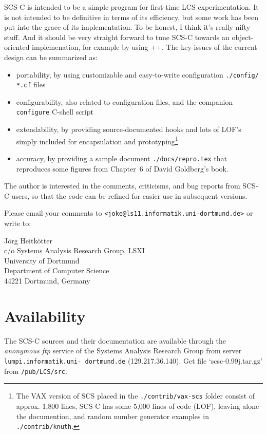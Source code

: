 SCS-C is intended to be a simple program for first-time LCS experimentation.
It is not intended to be definitive in terms of its efficiency, but
some work has been put into the grace of its implementation. To be honest,
I think it's really nifty stuff.
And it should be very straight forward to tune SCS-C towards an
object-oriented implemenation, for example by using \C++.
The key issues of the current design can be summarized as:
\begin{itemize}
\item
portability, by using customizable and easy-to-write configuration
{\tt ./config/ *.cf} files
\item
configurability, also related to configuration files, and the
companion {\tt configure} C-shell script
\item
extendability, by providing source-documented hooks and lots of
LOF's simply included for encapsulation and prototyping\footnote{%
The {\sc VAX} version of SCS placed in the {\tt ./contrib/vax-scs} folder
consist of approx. 1,800 lines, SCS-C has some 5,000 lines of code (LOF),
leaving alone the documention, and random number generator examples in
{\tt ./contrib/knuth}.}
\item
accuracy, by providing a sample document {\tt ./docs/repro.tex} that
reproduces some figures from Chapter~6 of David Goldberg's book.
\end{itemize}

The author is interested in the comments, criticisms, and bug reports
from SCS-C users, so that the code can be refined for easier use in
subsequent versions.

Please email your comments to \verb+<joke@ls11.informatik.uni-dortmund.de>+
or write to:
\begin{center}
J\"org Heitk\"otter				\\
c/o Systems Analysis Research Group, LSXI	\\
University of Dortmund				\\
Department of Computer Science			\\
44221 Dortmund, Germany				\\
\end{center}


\section{Availability}

The SCS-C sources and their documentation are available through the
{\em anonymous ftp} service of the Systems Analysis Research Group from
server {\tt lumpi.informatik.uni- dortmund.de} (129.217.36.140).
Get file `scsc-0.99j.tar.gz' from {\tt /pub/LCS/src}.

